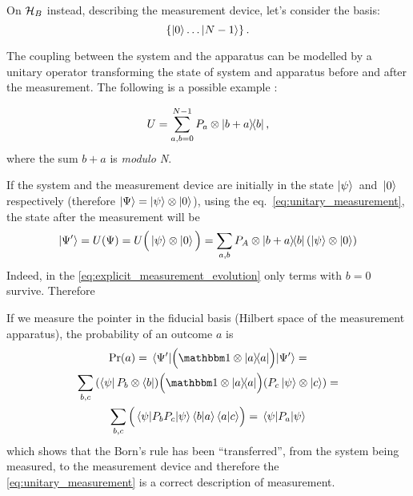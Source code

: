 On $\mathcal{H}_B$ instead, describing the measurement device, let's consider
the
basis:
\[
  \left\{\ket{0} \dots \ket{N-1}\right\} \text{.}
\]

The coupling between the system and the apparatus
can be modelled by
a unitary operator
transforming the state of system and apparatus before and after the measurement.
The following is a possible
example \parencite[sec. 3.1.1 ``Orthogonal Measurements'']{PreskillNotes}:

\begin{equation}\label{eq:unitary_measurement}
  U = \sum_{a, b = 0}^{N-1} P_a \otimes \ketbra{b+a}{b} \text{,}
\end{equation}
where the sum $b+a$ is \emph{modulo N}.

If the system and the measurement device are initially in the
state $\ket{\psi}$~and~$\ket{0}$ respectively
(therefore $\ket{\Psi} = \ket{\psi} \otimes \ket{0}$),
using the eq.~\eqref{eq:unitary_measurement},
the state after the measurement will be %
%
\begin{equation}\label{eq:explicit_measurement_evolution}
  \ket{\Psi^{\prime}} = U(\Psi) = U\Big(\ket{\psi} \otimes \ket{0}\Big)  =\sum_{a, b} P_A \otimes \ketbra{b+a}{b} \qty(\ket{\psi} \otimes \ket{0})
\end{equation}
Indeed, in the \ref{eq:explicit_measurement_evolution} only terms with $b=0$ survive.
Therefore

If we measure the pointer in the fiducial basis
(Hilbert space of the measurement apparatus),
the probability of an outcome $a$ is
\begin{multline}\label{eq:measurement_probability}
  \Pr(a) = \expval{\qty\Big(\idop\ox\ketbra{a})}{\Psi^{\prime}} = \\
    \sum_{b,c}
      \qty(\bra{\psi}P_{b}\ox\bra{b})
      \qty\Big(\idop\ox\ketbra{a})
      \qty(P_{c}\ket{\psi}\ox\ket{c}) = \\
    \sum_{b,c}\qty\Big(\expval{P_bP_c}{\psi} \braket{b}{a} \braket{a}{c}) =
    \expval{P_a}{\psi}
\end{multline}
which shows that the Born's rule has been ``transferred'', from the system being
measured, to the measurement device and therefore the
\eqref{eq:unitary_measurement} is a correct description of measurement.

